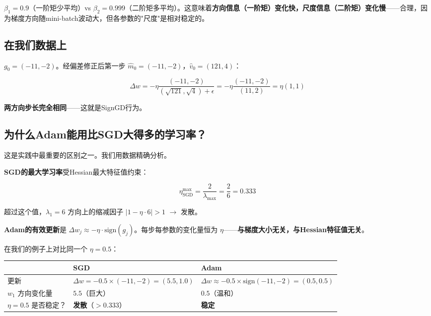\documentclass[12pt,a4paper]{article}
\begin{document}
$\beta_1 = 0.9$（一阶矩少平均）vs $\beta_2 = 0.999$（二阶矩多平均）。这意味着\textbf{方向信息（一阶矩）变化快，尺度信息（二阶矩）变化慢}——合理，因为梯度方向随mini-batch波动大，但各参数的"尺度"是相对稳定的。


\subsection{在我们数据上}

$g_0 = (-11, -2)$。经偏差修正后第一步 $\hat{m}_0 = (-11,-2)$，$\hat{v}_0 = (121, 4)$：


\[\Delta w = -\eta \frac{(-11,-2)}{(\sqrt{121},\sqrt{4})+\epsilon} = -\eta \frac{(-11,-2)}{(11, 2)} = \eta(1, 1)\]

\textbf{两方向步长完全相同}——这就是SignGD行为。


\subsection{为什么Adam能用比SGD大得多的学习率？}

这是实践中最重要的区别之一。我们用数据精确分析。

\textbf{SGD的最大学习率}受Hessian最大特征值约束：


\[\eta_{\text{SGD}}^{\max} = \frac{2}{\lambda_{\max}} = \frac{2}{6} = 0.333\]

超过这个值，$\lambda_1 = 6$ 方向上的缩减因子 $|1 - \eta \cdot 6| > 1$ $\to$ 发散。

\textbf{Adam的有效更新}是 $\Delta w_j \approx -\eta \cdot \text{sign}(g_j)$。每步每参数的变化量恒为 $\eta$——\textbf{与梯度大小无关，与Hessian特征值无关}。

在我们的例子上对比同一个 $\eta = 0.5$：






\begin{center}\small
\begin{longtable}{|l|l|l|}
\hline
 & SGD & Adam \\
\hline
更新 & $\Delta w = -0.5 \times (-11, -2) = (5.5, 1.0)$ & $\Delta w \approx -0.5 \times \text{sign}(-11,-2) = (0.5, 0.5)$ \\
$w_1$ 方向变化量 & $5.5$（巨大） & $0.5$（温和） \\
$\eta = 0.5$ 是否稳定？ & \textbf{发散}（$> 0.333$） & \textbf{稳定} \\
\hline
\end{longtable}
\end{center}
\end{document}
